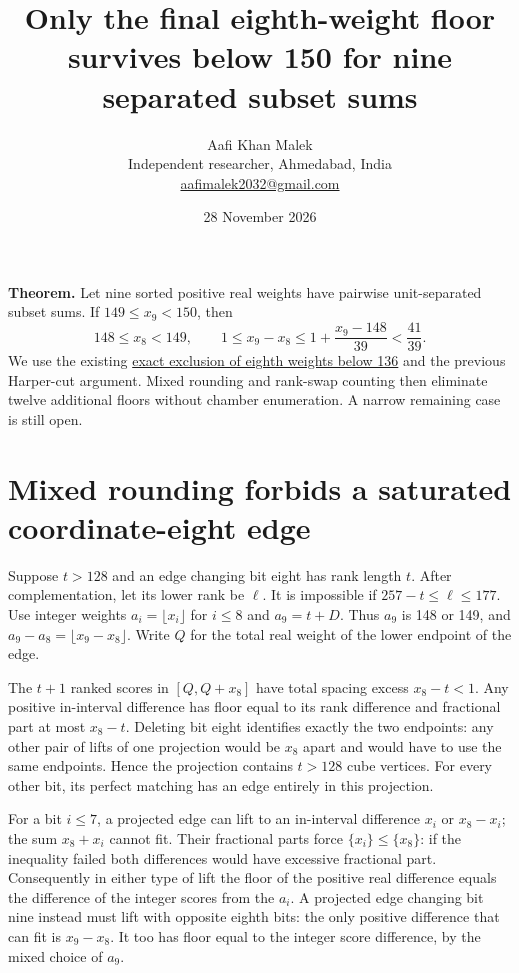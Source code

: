 \documentclass[11pt,letterpaper]{article}
\title{Only the final eighth-weight floor survives below 150 for nine separated subset sums}
\author{Aafi Khan Malek\\ \small Independent researcher, Ahmedabad, India\\
\small\href{mailto:aafimalek2032@gmail.com}{aafimalek2032@gmail.com}}
\date{28 November 2026}
\begin{document}
\maketitle
\textbf{Theorem.} Let nine sorted positive real weights
have pairwise unit-separated subset sums. If \(149\le x_9<150\), then
\[
 148\le x_8<149,\qquad
 1\le x_9-x_8\le 1+\frac{x_9-148}{39}<\frac{41}{39}.
\]
We use the existing
\href{https://github.com/Aafimalek/novel-discoveries/tree/aee69772bd5c97a7f956f92e2ad5d1cacdac0a2a/nine-separated-subset-sums/verification/rank-cuts-below-150/penultimate-cap-135}{exact exclusion of eighth weights below 136}
and the previous Harper-cut argument. Mixed rounding and rank-swap
counting then eliminate twelve additional floors without chamber
enumeration. A narrow remaining case is still open.

\section{Mixed rounding forbids a saturated coordinate-eight
edge}\label{mixed-rounding-forbids-a-saturated-coordinate-eight-edge}

Suppose \(t>128\) and an edge changing bit eight has rank length \(t\).
After complementation, let its lower rank be \(\ell\). It is impossible
if \(257-t\le\ell\le177\). Use integer weights
\(a_i=\lfloor x_i\rfloor\) for \(i\le8\) and \(a_9=t+D\). Thus \(a_9\)
is 148 or 149, and \(a_9-a_8=\lfloor x_9-x_8\rfloor\). Write \(Q\) for
the total real weight of the lower endpoint of the edge.

The \(t+1\) ranked scores in \([Q,Q+x_8]\) have total spacing excess
\(x_8-t<1\). Any positive in-interval difference has floor equal to its
rank difference and fractional part at most \(x_8-t\). Deleting bit
eight identifies exactly the two endpoints: any other pair of lifts of
one projection would be \(x_8\) apart and would have to use the same
endpoints. Hence the projection contains \(t>128\) cube vertices. For
every other bit, its perfect matching has an edge entirely in this
projection.

For a bit \(i\le7\), a projected edge can lift to an in-interval
difference \(x_i\) or \(x_8-x_i\); the sum \(x_8+x_i\) cannot fit. Their
fractional parts force \(\{x_i\}\le\{x_8\}\): if the inequality failed
both differences would have excessive fractional part. Consequently in
either type of lift the floor of the positive real difference equals the
difference of the integer scores from the \(a_i\). A projected edge
changing bit nine instead must lift with opposite eighth bits: the only
positive difference that can fit is \(x_9-x_8\). It too has floor equal
to the integer score difference, by the mixed choice of \(a_9\).
\end{document}
